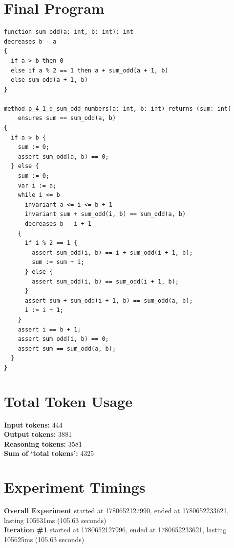 \documentclass{article}
\begin{document}
\section*{Final Program}
\begin{lstlisting}
function sum_odd(a: int, b: int): int
decreases b - a
{
  if a > b then 0
  else if a % 2 == 1 then a + sum_odd(a + 1, b)
  else sum_odd(a + 1, b)
}

method p_4_1_d_sum_odd_numbers(a: int, b: int) returns (sum: int)
	ensures sum == sum_odd(a, b)
{
  if a > b {
    sum := 0;
    assert sum_odd(a, b) == 0;
  } else {
    sum := 0;
    var i := a;
    while i <= b
      invariant a <= i <= b + 1
      invariant sum + sum_odd(i, b) == sum_odd(a, b)
      decreases b - i + 1
    {
      if i % 2 == 1 {
        assert sum_odd(i, b) == i + sum_odd(i + 1, b);
        sum := sum + i;
      } else {
        assert sum_odd(i, b) == sum_odd(i + 1, b);
      }
      assert sum + sum_odd(i + 1, b) == sum_odd(a, b);
      i := i + 1;
    }
    assert i == b + 1;
    assert sum_odd(i, b) == 0;
    assert sum == sum_odd(a, b);
  }
}
\end{lstlisting}
\section*{Total Token Usage}
\textbf{Input tokens: }444
\\\textbf{Output tokens: }3881
\\\textbf{Reasoning tokens: }3581
\\\textbf{Sum of `total tokens': }4325
\section*{Experiment Timings}
\textbf{Overall Experiment} started at 1780652127990, ended at 1780652233621, lasting 105631ms (105.63 seconds)
\\\textbf{Iteration \#1} started at 1780652127996, ended at 1780652233621, lasting 105625ms (105.63 seconds)
\end{document}
